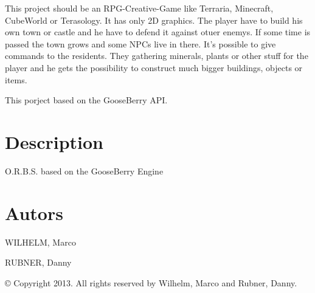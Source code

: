 This project should be an R\-P\-G-\/\-Creative-\/\-Game like Terraria, Minecraft, Cube\-World or Terasology. It has only 2\-D graphics. The player have to build his own town or castle and he have to defend it against otuer enemys. If some time is passed the town grows and some N\-P\-Cs live in there. It's possible to give commands to the residents. They gathering minerals, plants or other stuff for the player and he gets the possibility to construct much bigger buildings, objects or items.

This porject based on the Goose\-Berry A\-P\-I.

\section*{Description }

O.\-R.\-B.\-S. based on the Goose\-Berry Engine

\section*{Autors }


\begin{DoxyItemize}
\item W\-I\-L\-H\-E\-L\-M, Marco
\item R\-U\-B\-N\-E\-R, Danny
\end{DoxyItemize}

© Copyright 2013. All rights reserved by Wilhelm, Marco and Rubner, Danny. 